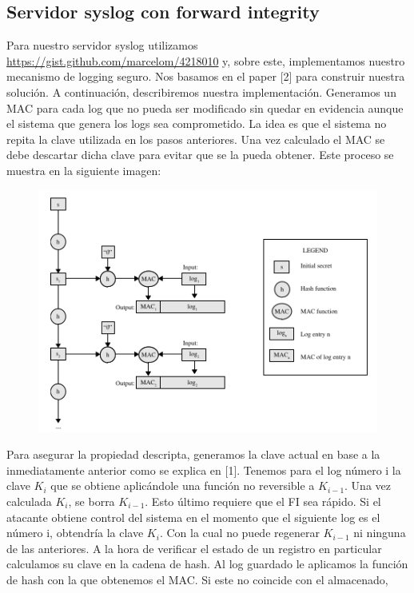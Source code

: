 \subsection{Servidor syslog con forward integrity}
Para nuestro servidor syslog utilizamos \hyperlink{https://gist.github.com/marcelom/4218010 }{https://gist.github.com/marcelom/4218010} y, sobre este, implementamos nuestro 
mecanismo de logging seguro. Nos basamos en el paper [2] para construir nuestra solución. A continuación, describiremos nuestra implementación.
Generamos un MAC para cada log que no pueda ser modificado sin quedar en evidencia
aunque el sistema que genera los logs sea comprometido. La idea es que el sistema no repita la clave utilizada en los pasos anteriores. Una vez calculado
el MAC se debe descartar dicha clave para evitar que se la pueda obtener. Este proceso se muestra en la siguiente imagen:
\begin{figure}[H]
\centering
\includegraphics[scale=1]{imagenes/MAC.png}
\end{figure}
Para asegurar la propiedad descripta, generamos la clave actual en base a la inmediatamente anterior como se explica en [1].
Tenemos para el log número i la clave $K_{i}$ que se obtiene aplicándole una función no reversible a
$K_{i-1}$. Una vez calculada $K_{i}$, se borra $K_{i-1}$. Esto último requiere que el FI sea rápido. Si el atacante obtiene control del sistema en el momento que el siguiente log es el número i,
obtendría la clave $K_{i}$. Con la cual no puede regenerar $K_{i-1}$ ni ninguna de las anteriores.
A la hora de verificar el estado de un registro en particular calculamos su clave en la cadena de hash.
Al log guardado le aplicamos la función de hash con la que obtenemos el MAC. Si este no coincide con el almacenado,
